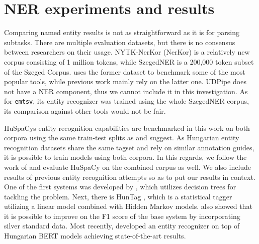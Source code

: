 \documentclass{llncs}
\newcommand{\emtsv}{\texttt{emtsv}}
\newcommand{\udpipe}{UDPipe}
\newcommand{\huspacy}{HuSpaCy}
\begin{document}
\section{NER experiments and results}

Comparing named entity results is not as straightforward as it is for parsing subtasks. There are multiple evaluation datasets, but there is no consensus between researchers on their usage. NYTK-NerKor (NerKor) \citep{NerKor} is a relatively new corpus consisting of  1 million tokens, while SzegedNER \citep{szeged-ner-corpus} is a 200,000 token subset of the Szeged Corpus.  \citet{nerkor-eval} uses the former dataset to benchmark some of the most popular tools, while previous work mainly rely on the latter one.
 \udpipe{} does not have a NER component, thus we cannot include it in this investigation. As for \emtsv, its entity recognizer was trained using the whole SzegedNER corpus, its comparison against other tools would not be fair.

\huspacy\textquotesingle s entity recognition capabilities are benchmarked in this work on both corpora using the same train-test splits as \citet{szarvas-ner} and \citet{nerkor-eval} suggest. 
As Hungarian entity recognition datasets share the same tagset and rely on similar annotation guides, it is possible to train models using both corpora. In this regards, we follow the work of \citet{nerkor-eval} and evaluate \huspacy{} on the combined corpus as well.
We also include results of previous entity recognition attempts so as to put our results in context. One of the first systems was developed by \cite{szarvas-ner}, which utilizes decision trees for tackling the problem. Next, there is HunTag \citep{huntag, simon-ner}, which is a statistical tagger utilizing a linear model combined with Hidden Markov models. \citet{simon-ner} also showed that it is possible to improve on the F1 score of the base system by incorporating silver standard data. Most recently, \cite{embert} developed an entity recognizer on top of Hungarian BERT models \citep{hubert} achieving state-of-the-art results.

\newlength{\lnersz}
\settowidth{\lnersz}{SzegedNer}
\end{document}
